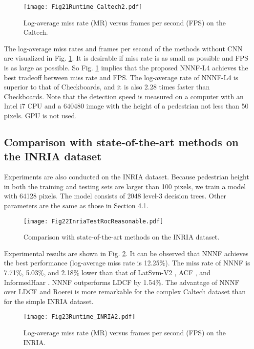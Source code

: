\documentclass[10pt,twocolumn,letterpaper]{article}
\begin{document}
\begin{figure}[!t]
\centering
\texttt{[image: Fig21Runtime\_Caltech2.pdf]}
\caption{Log-average miss rate (MR) versus frames per second (FPS) on the Caltech.}
\label{FigRunTimeCaltech}
\end{figure}

The log-average miss rates and frames per second of the methods without CNN are visualized in Fig. \ref{FigRunTimeCaltech}. It is 
desirable if miss rate is as small as possible and FPS is as large as 
possible. So Fig. \ref{FigRunTimeCaltech} implies that the proposed NNNF-L4 achieves the best 
tradeoff between miss rate and FPS. The log-average rate of NNNF-L4 is superior to 
that of Checkboards, and it is also 2.28 times faster than Checkboards. Note that the detection speed is 
measured on a computer with an Intel i7 CPU and a 640480 image 
with the height of a pedestrian not less than 50 pixels. GPU is not used. 

\subsection{Comparison with state-of-the-art methods on the INRIA dataset}
Experiments are also conducted on the INRIA dataset. Because pedestrian 
height in both the training and testing sets are larger than 100 pixels, we 
train a model with 64128 pixels. The model consists of 2048 level-3 
decision trees. Other parameters are the same as those in Section 4.1. 

\begin{figure}[!t]
\centering
\texttt{[image: Fig22InriaTestRocReasonable.pdf]}
\caption{Comparison with state-of-the-art methods on the INRIA dataset.}
\label{FigINRIA}
\end{figure}


Experimental results are shown in Fig. \ref{FigINRIA}. It can be observed that NNNF achieves the best performance (log-average miss rate is 
12.25{\%}). The miss rate of NNNF is 7.71{\%}, 5.03{\%}, and 2.18{\%}
lower than that of LatSvm-V2 \cite{Felzenszwalb_DPM_CVPR_2008}, ACF \cite{Dollar_ACF_PAMI_2014}, and InformedHaar \cite{Zhang_Info.Haar_CVPR_2014}. NNNF outperforms LDCF 
\cite{Nam_LDCF_NIPS_2014} by 1.54{\%}. The advantage 
of NNNF over LDCF \cite{Nam_LDCF_NIPS_2014} and Roerei \cite{Benenson_SquareChns_CVPR_2013} is more remarkable for the complex Caltech 
dataset than for the simple INRIA dataset. 

\begin{figure}[!t]
\centering
\texttt{[image: Fig23Runtime\_INRIA2.pdf]}
\caption{Log-average miss rate (MR) versus frames per second (FPS) on the INRIA.}
\label{FigRunTimeINRIA}
\end{figure}
\end{document}

